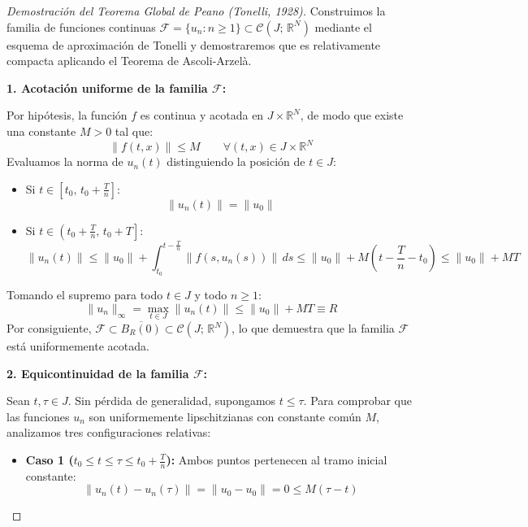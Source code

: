\begin{proof}[Demostración del Teorema Global de Peano (Tonelli, 1928)]
    Construimos la familia de funciones continuas $\mathcal{F} = \{ u_n : n \geq 1 \} \subset \mathcal{C}(J; \, \mathbb{R}^N)$ mediante el esquema de aproximación de Tonelli y demostraremos que es relativamente compacta aplicando el Teorema de Ascoli-Arzelà.

    \medskip

    \textbf{1. Acotación uniforme de la familia $\mathcal{F}$:}

    Por hipótesis, la función $f$ es continua y acotada en $J \times \mathbb{R}^N$, de modo que existe una constante $M > 0$ tal que:
    \[
        \|f(t, x)\| \leq M \qquad \forall (t, x) \in J \times \mathbb{R}^N
    \]
    Evaluamos la norma de $u_n(t)$ distinguiendo la posición de $t \in J$:
    \begin{itemize}
        \item Si $t \in \left[ t_0, \, t_0 + \frac{T}{n} \right]$:
        \[
            \|u_n(t)\| = \|u_0\|
        \]
        \item Si $t \in \left( t_0 + \frac{T}{n}, \, t_0 + T \right]$:
        \[
            \|u_n(t)\| \leq \|u_0\| + \int_{t_0}^{t - \frac{T}{n}} \|f(s, u_n(s))\| \, ds \leq \|u_0\| + M\left( t - \frac{T}{n} - t_0 \right) \leq \|u_0\| + MT
        \]
    \end{itemize}
    Tomando el supremo para todo $t \in J$ y todo $n \geq 1$:
    \[
        \|u_n\|_\infty = \max_{t \in J} \|u_n(t)\| \leq \|u_0\| + MT \equiv R
    \]
    Por consiguiente, $\mathcal{F} \subset \overline{B_R(0)} \subset \mathcal{C}(J; \, \mathbb{R}^N)$, lo que demuestra que la familia $\mathcal{F}$ está uniformemente acotada.

    \medskip

    \textbf{2. Equicontinuidad de la familia $\mathcal{F}$:}

    Sean $t, \tau \in J$. Sin pérdida de generalidad, supongamos $t \leq \tau$. Para comprobar que las funciones $u_n$ son uniformemente lipschitzianas con constante común $M$, analizamos tres configuraciones relativas:

    \begin{itemize}
        \item \textbf{Caso 1 ($t_0 \leq t \leq \tau \leq t_0 + \frac{T}{n}$):}
        Ambos puntos pertenecen al tramo inicial constante:
        \[
            \|u_n(t) - u_n(\tau)\| = \|u_0 - u_0\| = 0 \leq M (\tau - t)
        \]


\end{itemize}
\end{proof}
